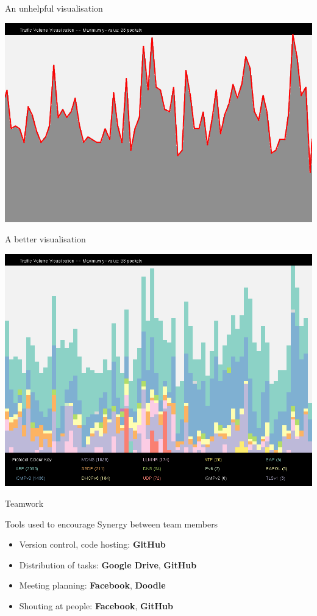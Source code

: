 \documentclass{beamer}
\begin{document}
    \begin{frame}{An unhelpful visualisation}

        \includegraphics[width=\textwidth,keepaspectratio]{img/ex0.png}

    \end{frame}

    \begin{frame}{A better visualisation}

        \includegraphics[width=\textwidth,keepaspectratio]{img/ex1.png}

    \end{frame}

    \begin{frame}{Teamwork}

        Tools used to encourage Synergy\small{\texttrademark} between team members
        \begin{itemize}
            \item{Version control, code hosting: \textbf{GitHub}}
            \item{Distribution of tasks: \textbf{Google Drive}, \textbf{GitHub}}
            \item{Meeting planning: \textbf{Facebook}, \textbf{Doodle}}
            \item{Shouting at people: \textbf{Facebook}, \textbf{GitHub}}
        \end{itemize}

    \end{frame} 
\end{document}

